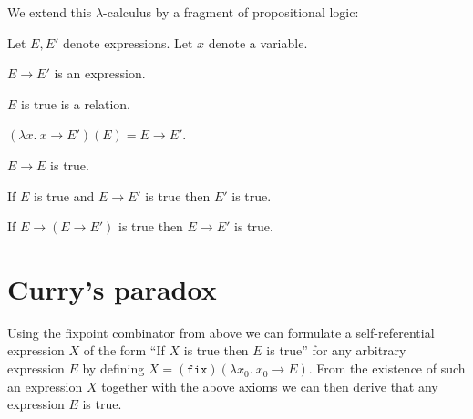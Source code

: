 \documentclass{article}
\newcommand{\varzero}{x_0}
\newcommand{\abs}[2]{\lambda#1.\ #2}
\newcommand{\app}[2]{(#1)(#2)}
\newcommand{\fix}{\texttt{fix}}
\begin{document}
  \noindent We extend this $\lambda$-calculus by a fragment of propositional
  logic:

  \begin{forthel}  
    Let $E, E'$ denote expressions.
    Let $x$ denote a variable.

    \begin{signature*}[Implication]\label{implication}
      $E \rightarrow E'$ is an expression.
    \end{signature*}
  
    \begin{signature*}[Truth]\label{truth}
      $E$ is true is a relation.
    \end{signature*}
  
    \begin{axiom*}\label{beta_reduction}
      $\app{\abs{x}{x \rightarrow E'}}{E} = E \rightarrow E'$.
    \end{axiom*}
  
    \begin{axiom*}[Reflexivity]\label{reflexivity}
      $E \rightarrow E$ is true.
    \end{axiom*}
  
    \begin{axiom*}\label{modus_ponens}
      If $E$ is true and $E \rightarrow E'$ is true then $E'$ is true.
    \end{axiom*}
  
    \begin{axiom*}[Strengthening]\label{strengthening}
      If $E \rightarrow (E \rightarrow E')$ is true then $E \rightarrow E'$ is true.
    \end{axiom*}
  \end{forthel}


  \section*{Curry's paradox}

  \noindent Using the fixpoint combinator from above we can formulate a 
  self-referential expression $X$ of the form ``If $X$ is true then $E$ is
  true'' for any arbitrary expression $E$ by defining
  $X = \app{\fix}{\abs{\varzero}{\varzero \rightarrow E}}$.
  From the existence of such an expression $X$ together with the above axioms 
  we can then derive that any expression $E$ is true.
\end{document}
